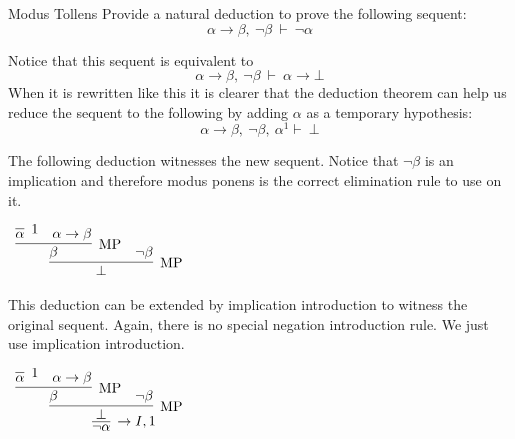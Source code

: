 \documentclass{book}
\begin{document}
    \begin{eg}{Modus Tollens}
        Provide a natural deduction to prove the following sequent: $$\alpha \to \beta, \ \lnot \beta \ \vdash \ \lnot \alpha$$

        Notice that this sequent is equivalent to $$\alpha \to \beta, \ \lnot \beta \ \vdash \ \alpha \to \bot$$ When it is rewritten like this it is clearer that the deduction theorem can help us reduce the sequent to the following by adding $\alpha$ as a temporary hypothesis: $$\alpha \to \beta, \ \lnot \beta, \ \alpha^{1} \vdash \ \bot$$

        The following deduction witnesses the new sequent. Notice that $\lnot \beta$ is an implication and therefore modus ponens is the correct elimination rule to use on it. 

        \begin{center}
            $\begin{array}{c}
                \infer[\MP]{\bot}
                        {\infer[\MP]{\beta}
                            {\infer[1]{\alpha}
                                {}
                            &
                            \alpha \to \beta}
                        &
                        \lnot \beta}
            \end{array}$
        \end{center}  

        This deduction can be extended by implication introduction to witness the original sequent. Again, there is no special negation introduction rule. We just use implication introduction.

        \begin{center}
            $\begin{array}{c}
                \infer[\to I,1]{\lnot \alpha}
                    {\infer[\MP]{\bot}
                        {\infer[\MP]{\beta}
                            {\infer[1]{\alpha}
                                {}
                            &
                            \alpha \to \beta}
                        &
                        \lnot \beta}}
            \end{array}$
        \end{center}        
    \end{eg}
\end{document}

